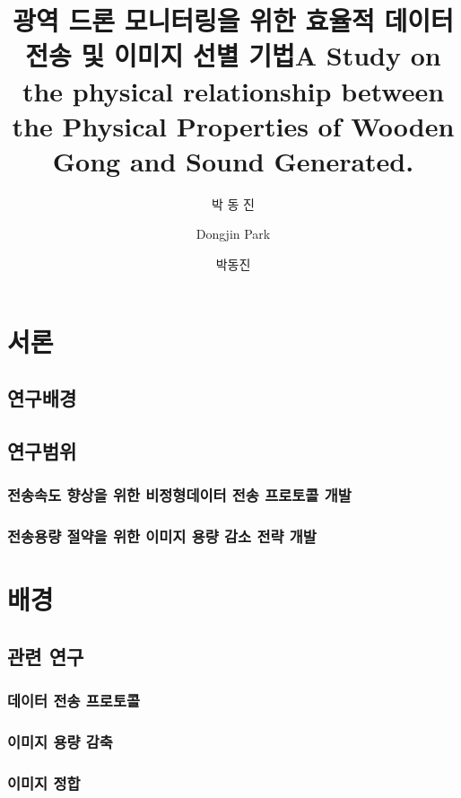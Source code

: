 \documentclass[master, korean]{pnuthesis}
\title[korean]{광역 드론 모니터링을 위한 효율적 데이터 전송 및 이미지 선별 기법}
\title[english]{A Study on the physical relationship between the Physical Properties of Wooden Gong and Sound Generated.}
\author[korean]{박 동 진}
\author[english]{Dongjin Park}
\author[nospace]{박동진}
\begin{document}
\renewcommand{\baselinestretch}{1.5}    %
\selectfont                             %

\changepage{5mm}{}{}{}{}{}{}{}{-5mm}    %
\makelists   %



\chapter{서론}

\section{연구배경}

\section{연구범위}

\subsection{전송속도 향상을 위한 비정형데이터 전송 프로토콜 개발}
\subsection{전송용량 절약을 위한 이미지 용량 감소 전략 개발}

\chapter{배경}
\section{관련 연구}

\subsection{데이터 전송 프로토콜}
\subsection{이미지 용량 감축}
\subsection{이미지 정합}
\end{document}
